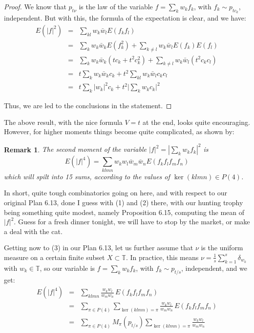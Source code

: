 \documentclass[12pt]{amsbook}
\newtheorem{remark}[theorem]{Remark}
\begin{document}
\begin{proof}
We know that $p_{t\nu}$ is the law of the variable $f=\sum_kw_kf_k$, with $f_k\sim p_{tc_k}$, independent. But with this, the formula of the expectation is clear, and we have:
\begin{eqnarray*}
E(|f|^2)
&=&\sum_{kl}w_k\bar{w}_lE(f_kf_l)\\
&=&\sum_kw_k\bar{w}_kE(f_k^2)+\sum_{k\neq l}w_k\bar{w}_lE(f_k)E(f_l)\\
&=&\sum_kw_k\bar{w}_k(tc_k+t^2c_k^2)+\sum_{k\neq l}w_k\bar{w}_l(t^2c_kc_l)\\
&=&t\sum_kw_k\bar{w}_kc_k+t^2\sum_{kl}w_k\bar{w}_lc_kc_l\\
&=&t\sum_k|w_k|^2c_k+t^2\Big|\sum_kw_kc_k\Big|^2
\end{eqnarray*}

Thus, we are led to the conclusions in the statement.
\end{proof}

The above result, with the nice formula $V=t$ at the end, looks quite encouraging. However, for higher moments things become quite complicated, as shown by:

\begin{remark}
The second moment of the variable $|f|^2=|\sum_kw_kf_k|^2$ is
$$E(|f|^4)=\sum_{klmn}w_kw_l\bar{w}_m\bar{w}_nE(f_kf_lf_mf_n)$$
which will spilt into 15 sums, according to the values of $\ker(klmn)\in P(4)$.
\end{remark}

In short, quite tough combinatorics going on here, and with respect to our original Plan 6.13, done I guess with (1) and (2) there, with our hunting trophy being something quite modest, namely Proposition 6.15, computing the mean of $|f|^2$. Guess for a fresh dinner tonight, we will have to stop by the market, or make a deal with the cat.

\bigskip

Getting now to (3) in our Plan 6.13, let us further assume that $\nu$ is the uniform measure on a certain finite subset $X\subset\mathbb T$. In practice, this means $\nu=\frac{1}{s}\sum_{k=1}^s\delta_{w_k}$ with $w_k\in\mathbb T$, so our variable is $f=\sum_kw_kf_k$, with $f_k\sim p_{t/s}$, independent, and we get:
\begin{eqnarray*}
E(|f|^4)
&=&\sum_{klmn}\frac{w_kw_l}{w_mw_n}\,E(f_kf_lf_mf_n)\\
&=&\sum_{\pi\in P(4)}\sum_{\ker{(klmn)}=\pi}\frac{w_kw_l}{w_mw_n}\,E(f_kf_lf_mf_n)\\
&=&\sum_{\pi\in P(4)}M_\pi(p_{t/s})\sum_{\ker{(klmn)}=\pi}\frac{w_kw_l}{w_mw_n}
\end{eqnarray*}
\end{document}
